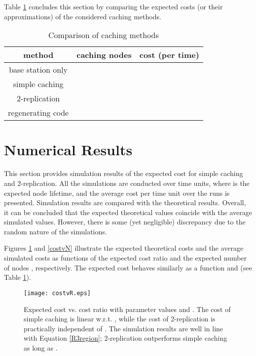 \documentclass[10pt,conference]{IEEEtran}
\begin{document}
Table \ref{tab} concludes this section by comparing the expected costs (or their approximations) of the considered caching methods.
\begin{table}[htb]
\begin{center}
\caption{Comparison of caching methods}
\def\arraystretch{2}
\begin{tabular}{ | c | c | c |}
\hline
\textbf{method} & \textbf{caching nodes} & \textbf{cost (per time)}  \\ \hline
base station only &  &  \\ \hline
simple caching &  &  \\ \hline
2-replication &  &  \\ \hline
regenerating code &  &  \\ \hline
\end{tabular}
\label{tab}
\end{center}
\end{table}

\newpage
\section{Numerical Results}\label{numericalresultssec}
This section provides simulation results of the expected cost for simple caching and 2-replication. All the simulations are conducted over  time units, where  is the expected node lifetime, and the average cost per time unit over the runs is presented. Simulation results are compared with the theoretical results. Overall, it can be concluded that the expected theoretical values coincide with the average simulated values. However, there is some (yet negligible) discrepancy due to the random nature of the simulations.

Figures \ref{costvR} and \ref{costvN} 
illustrate the expected theoretical costs and the average simulated costs as
functions of the expected cost ratio  and the expected number of nodes
, respectively. The expected
cost behaves similarly as a function  and  (see Table
\ref{tab}). 

\begin{figure}[tbhp]
\centering \texttt{[image: costvR.eps]}
\caption{Expected cost vs. cost ratio  with parameter values  and . The cost of simple caching is linear w.r.t. , while the cost of 2-replication is practically independent of . The simulation results are well in line with Equation \eqref{R3region}; 2-replication outperforms simple caching as long as .}
\label{costvR}
\end{figure}
\end{document}
